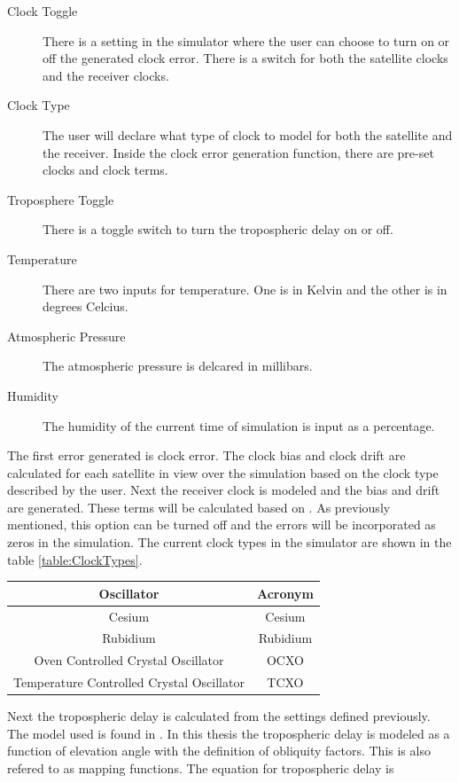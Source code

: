 \documentclass[12pt]{report}
\begin{document}
\begin{description}
    \item[Clock Toggle] There is a setting in the simulator where the user can choose to turn on or off the generated clock error. There is a switch for both the satellite clocks and the receiver clocks.
    \item[Clock Type] The user will declare what type of clock to model for both the satellite and the receiver. Inside the clock error generation function, there are pre-set clocks and clock terms.
    \item[Troposphere Toggle] There is a toggle switch to turn the tropospheric delay on or off.
    \item[Temperature] There are two inputs for temperature. One is in Kelvin and the other is in degrees Celcius. 
    \item[Atmospheric Pressure] The atmospheric pressure is delcared in millibars.
    \item[Humidity] The humidity of the current time of simulation is input as a percentage.     
\end{description}


The first error generated is clock error. The clock bias and clock drift are calculated for each satellite in view over the simulation based on the clock type described by the user. Next the receiver clock is modeled and the bias and drift are generated. These terms will be calculated based on \cite{brown_introduction_2012}. As previously mentioned, this option can be turned off and the errors will be incorporated as zeros in the simulation. The current clock types in the simulator are shown in the table \ref{table:ClockTypes}. 

\begin{center}
\begin{tabular}{|c|c|}
    \hline
    Oscillator & Acronym\\
    \hline\hline
    Cesium & Cesium\\
    \hline
    Rubidium & Rubidium\\
    \hline
    Oven Controlled Crystal Oscillator & OCXO\\
    \hline
    Temperature Controlled Crystal Oscillator & TCXO\\
    \hline
\end{tabular}
\label{table:ClockTypes}

\end{center}

Next the tropospheric delay is calculated from the settings defined previously. The model used is found in \cite{misraGlobalPositioningSystem2012}. In this thesis the tropospheric delay is modeled as a function of elevation angle with the definition of obliquity factors. This is also refered to as mapping functions. The equation for tropospheric delay is 
\end{document}
